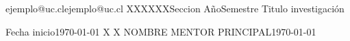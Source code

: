 \documentclass{style}
\begin{document}
\graphicspath{ {./img/} }
\renewcommand\cftsecfont{\normalsize}
\renewcommand\cftsecpagefont{\normalsize}
\renewcommand{\tablename}{Tabla}
\renewcommand{\figurename}{Figura}







% 



%



        {ejemplo@uc.cl}{ejemplo@uc.cl}
        {XXXXXX}{Seccion}
        {Año}{Semestre}
        {Titulo investigación}

        {Fecha inicio}{\today}
        {}{X} %
        {X}{} %
        {NOMBRE MENTOR PRINCIPAL}{\today}
\end{document}
